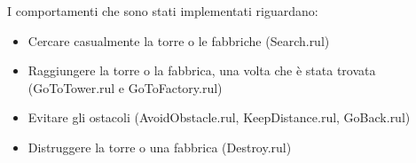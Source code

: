 I comportamenti che sono stati implementati riguardano:
\begin{itemize}
 \item Cercare casualmente la torre o le fabbriche (Search.rul)
 \item Raggiungere la torre o la fabbrica, una volta che è stata trovata (GoToTower.rul e GoToFactory.rul)
 \item Evitare gli ostacoli (AvoidObstacle.rul, KeepDistance.rul, GoBack.rul)
 \item Distruggere la torre o una fabbrica (Destroy.rul)
\end{itemize}